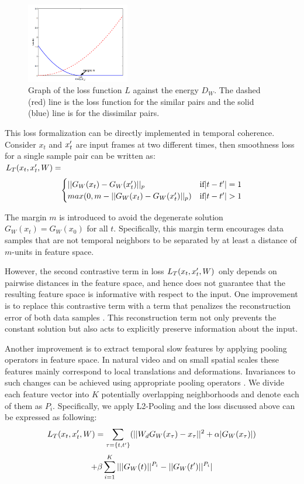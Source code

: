 \begin{figure}
\centering
\hspace{-3mm}
\includegraphics[width=0.4\textwidth]{./Images/twoloss.png}
\caption{Graph of the loss function $L$ against the energy $D_W$. The dashed (red) line is the loss function for the similar pairs and the solid (blue) line is for the dissimilar pairs.}
\label{fig:twoloss}
\vspace{-4mm}
\end{figure}

This loss formalization can be directly implemented in temporal coherence. Consider $x_t$ and $x_t\rq{}$ are input frames at two different times, then smoothness loss for a single sample pair can be written as:\\
$L_T(x_t, x_t\rq{}, W) = $
\[   
     \begin{cases}
       ||G_W(x_t) - G_W(x_t\rq{})||_p & \text{if} |t-t\rq{}| = 1\\
       max(0, m - ||G_W(x_t) - G_W(x_t\rq{})||_p) &\text{if} |t-t\rq{}| > 1 \\
     \end{cases}
\]

The margin $m$ is introduced to avoid the degenerate solution $G_W(x_t) = G_W(x_0)$ for all $t$. 
Specifically, this margin term encourages data samples that are not temporal neighbors to be separated by at least a distance of $m$-units in feature space. 

However, the second contrastive term in loss $L_T(x_t, x_t\rq{}, W)$ only depends on pairwise distances in the feature space, and hence does not guarantee that the resulting feature space is informative with respect to the input. 
One improvement is to replace this contrastive term with a term that penalizes the reconstruction error of both data samples \cite{LeCun2014coherence}. 
This reconstruction term not only prevents the constant solution but also acts to explicitly preserve information about the input.

Another improvement is to extract temporal slow features by applying pooling operators in feature space. 
In natural video and on small spatial scales these features mainly correspond to local translations and deformations. 
Invariances to such changes can be achieved using appropriate pooling operators \cite{Mallat2013scattering}.
We divide each feature vector into $K$ potentially overlapping neighborhoods and denote each of them as $P_i$. 
Specifically, we apply L2-Pooling and the loss discussed above can be expressed as following:
$$L_T(x_t, x_t\rq{}, W) = \sum_{\tau = \{t, t\rq{}\}} (||W_d G_W(x_\tau) - x_\tau||^2 + \alpha |G_W(x_\tau)|)$$
$$+ \beta \sum_{i=1}^K |||G_W(t)||^{P_i} -  ||G_W(t\rq{})||^{P_i}|$$